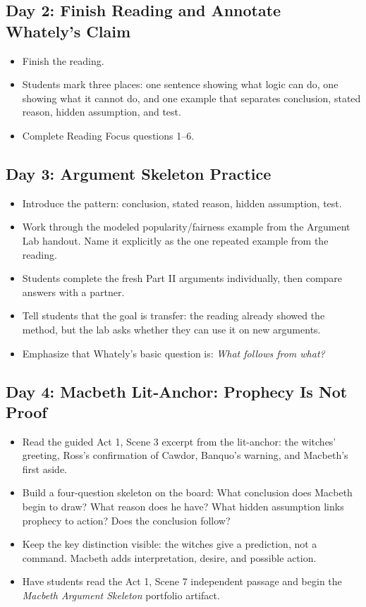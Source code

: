 \documentclass[12pt]{article}
\begin{document}
\subsection*{Day 2: Finish Reading and Annotate Whately's Claim}
\begin{itemize}[leftmargin=*]
\item Finish the reading.
\item Students mark three places: one sentence showing what logic can do, one showing what it cannot do, and one example that separates conclusion, stated reason, hidden assumption, and test.
\item Complete Reading Focus questions 1--6.
\end{itemize}

\subsection*{Day 3: Argument Skeleton Practice}
\begin{itemize}[leftmargin=*]
\item Introduce the pattern: conclusion, stated reason, hidden assumption, test.
\item Work through the modeled popularity/fairness example from the Argument Lab handout. Name it explicitly as the one repeated example from the reading.
\item Students complete the fresh Part II arguments individually, then compare answers with a partner.
\item Tell students that the goal is transfer: the reading already showed the method, but the lab asks whether they can use it on new arguments.
\item Emphasize that Whately's basic question is: \textit{What follows from what?}
\end{itemize}

\subsection*{Day 4: Macbeth Lit-Anchor: Prophecy Is Not Proof}
\begin{itemize}[leftmargin=*]
\item Read the guided Act 1, Scene 3 excerpt from the lit-anchor: the witches' greeting, Ross's confirmation of Cawdor, Banquo's warning, and Macbeth's first aside.
\item Build a four-question skeleton on the board: What conclusion does Macbeth begin to draw? What reason does he have? What hidden assumption links prophecy to action? Does the conclusion follow?
\item Keep the key distinction visible: the witches give a prediction, not a command. Macbeth adds interpretation, desire, and possible action.
\item Have students read the Act 1, Scene 7 independent passage and begin the \textit{Macbeth Argument Skeleton} portfolio artifact.
\end{itemize}
\end{document}

